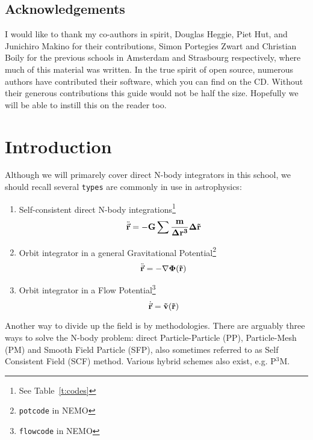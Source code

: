 \section*{Acknowledgements}

I would like to thank my co-authors in spirit, 
Douglas Heggie, Piet Hut, and Junichiro Makino for their contributions, 
Simon Portegies Zwart and Christian Boily for the previous schools in Amsterdam 
and Strasbourg respectively, where much of this material was written.
In the true spirit of open source, 
numerous authors have contributed their software, which you can find on
the CD. Without their generous contributions this guide would not be
half the size. 
Hopefully we will be able to instill this on the reader too.



\chapter                {Introduction}

Although we will primarely cover direct N-body integrators in this school,
we should recall several {\tt types} are commonly in use
in astrophysics:

\begin{enumerate}
\item
Self-consistent direct N-body integrations\footnote{See Table~\ref{t:codes}}
\begin{equation}
    \ddot{\vec{\bf r}} = -G \sum{ {m\over{\Delta r^3}} \Delta \vec{\bf r}}
\end{equation}

\item
Orbit integrator in a general Gravitational Potential\footnote{{\tt potcode} in NEMO}
\begin{equation}
    \ddot{\vec{\bf r}} = -\nabla \Phi(\vec{\bf r})
\end{equation}

\item
Orbit integrator in a Flow Potential\footnote{{\tt flowcode} in NEMO}
\begin{equation}
    \dot{\vec{\bf r}} = \vec{\bf v}(\vec{\bf r})
\end{equation}


\end{enumerate}

Another way to divide up the field is by methodologies. There are arguably
three ways to solve the N-body problem: direct Particle-Particle (PP),
Particle-Mesh (PM) and Smooth Field Particle (SFP), also sometimes 
referred to as Self Consistent Field (SCF) method. Various hybrid schemes
also exist, e.g. P$^3$M.

